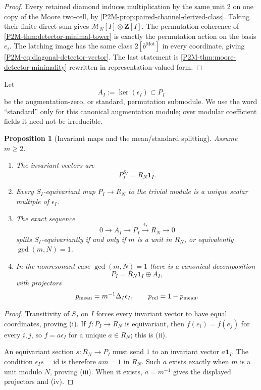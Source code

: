 \documentclass[11pt]{article}
\newtheorem{proposition}[theorem]{Proposition}
\theoremstyle{remark}
\newcommand{\Z}{\mathbf Z}
\newcommand{\Mot}{\mathrm{Mot}}
\begin{document}
\begin{proof}
Every retained diamond induces multiplication by the same unit $2$ on one
copy of the Moore two-cell, by
\cref{P2M-prop:paired-channel-derived-class}.  Taking their finite direct sum gives
$\mathcal M_N[I]\otimes\Z[I]$.  The permutation coherence of
\cref{P2M-thm:detector-minimal-tower} is exactly the permutation action on the
basis $e_i$.  The latching image has the same class $2[b^{\Mot}]$ in every
coordinate, giving \eqref{P2M-eq:diagonal-detector-vector}.  The last statement is
\cref{P2M-thm:moore-detector-minimality} rewritten in representation-valued form.
\end{proof}

Let
\begin{equation}
 A_I:=\ker(\epsilon_I)\subset P_I
\end{equation}
be the augmentation-zero, or standard, permutation submodule.  We use the
word ``standard'' only for this canonical augmentation module; over modular
coefficient fields it need not be irreducible.

\begin{proposition}[Invariant maps and the mean/standard splitting]
\label{P2M-prop:permutation-module-splitting}
Assume $m\ge2$.
\begin{enumerate}[label=\textup{(\roman*)}]
\item The invariant vectors are
\[
 P_I^{S_I}=R_N\mathbf 1_I.
\]
\item Every $S_I$-equivariant map $P_I\to R_N$ to the trivial module is a
      unique scalar multiple of $\epsilon_I$.
\item The exact sequence
\[
 0\longrightarrow A_I\longrightarrow P_I
 \xrightarrow{\ \epsilon_I\ }R_N\longrightarrow0
\]
      splits $S_I$-equivariantly if and only if $m$ is a unit in $R_N$, or
      equivalently $\gcd(m,N)=1$.
\item In the nonresonant case $\gcd(m,N)=1$ there is a canonical decomposition
\begin{equation}\label{P2M-eq:mean-standard-splitting}
 \boxed{
 P_I=R_N\mathbf 1_I\oplus A_I,}
\end{equation}
      with projectors
\[
 p_{\rm mean}=m^{-1}\Delta_I\epsilon_I,
 \qquad
 p_{\rm rel}=1-p_{\rm mean}.
\]
\end{enumerate}
\end{proposition}

\begin{proof}
Transitivity of $S_I$ on $I$ forces every invariant vector to have equal
coordinates, proving (i).  If $f:P_I\to R_N$ is equivariant, then
$f(e_i)=f(e_j)$ for every $i,j$, so $f=a\epsilon_I$ for a unique $a\in R_N$;
this is (ii).

An equivariant section $s:R_N\to P_I$ must send $1$ to an invariant vector
$a\mathbf 1_I$.  The condition $\epsilon_Is=\mathrm{id}$ is therefore
$am=1$ in $R_N$.  Such $a$ exists exactly when $m$ is a unit modulo $N$,
proving (iii).  When it exists, $a=m^{-1}$ gives the displayed projectors and
(iv).
\end{proof}
\end{document}
